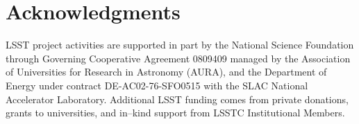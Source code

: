 \documentclass[iop]{emulateapj}
\begin{document}
\section*{Acknowledgments}
LSST project activities are supported in part by the National Science Foundation through Governing Cooperative Agreement 0809409 managed by the Association of Universities for Research in Astronomy (AURA), and the Department of Energy under contract DE-AC02-76-SFO0515 with the SLAC National Accelerator Laboratory. 
Additional LSST funding comes from private donations, grants to universities, and in--kind support from LSSTC Institutional Members.



\end{document}
